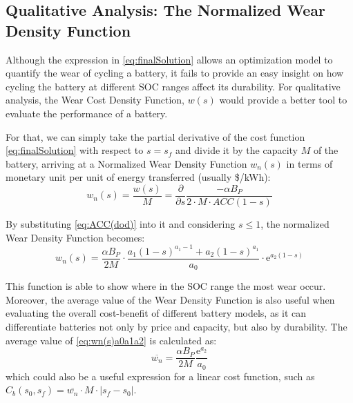 \documentclass{ieeeaccess}
\begin{document}
    \subsection{Qualitative Analysis: The Normalized Wear Density Function}
    Although the expression in \eqref{eq:finalSolution} allows an optimization model to quantify the wear of cycling a battery, it fails to provide an easy insight on how cycling the battery at different \ac{SOC} ranges affect its durability. For qualitative analysis, the Wear Cost Density Function, $w(s)$ would provide a better tool to evaluate the performance of a battery.
    
    For that, we can simply take the partial derivative of the cost function \ref{eq:finalSolution} with respect to $s=s_f$ and divide it by the capacity $M$ of the battery, arriving at a Normalized Wear Density Function $w_n(s)$ in terms of monetary unit per unit of energy transferred (usually \$/kWh):
    \small
		$$ w_n(s) = \frac{w(s)}{M} = \frac{\partial}{\partial s} \frac{- \alpha B_P}{2 \cdot M \cdot ACC(1-s)} $$
	\normalsize

    By substituting \eqref{eq:ACC(dod)} into it and considering $ s \le 1 $, the normalized Wear Density Function becomes:
    \small
    \begin{equation}
        w_n(s) = \frac{\alpha B_P}{2M} \cdot \frac{a_1(1-s)^{a_1-1} + a_2(1-s)^{a_1}}{a_0} \cdot \mathrm{e}^{a_2(1-s)}
        \label{eq:wn(s)a0a1a2}
    \end{equation}
	\normalsize
	
	This function is able to show where in the \ac{SOC} range the most wear occur. Moreover, the average value of the Wear Density Function is also useful when evaluating the overall cost-benefit of different battery models, as it can differentiate batteries not only by price and capacity, but also by durability. The average value of \eqref{eq:wn(s)a0a1a2} is calculated as:
		$$ \overline{w_n} = \frac{\alpha B_P}{2M} \frac{\mathrm{e}^{a_2}}{a_0} $$
	which could also be a useful expression for a linear cost function, such as $C_b(s_0, s_f) = \overline{w_n}  \cdot M \cdot |s_f - s_0|$.
\end{document}
